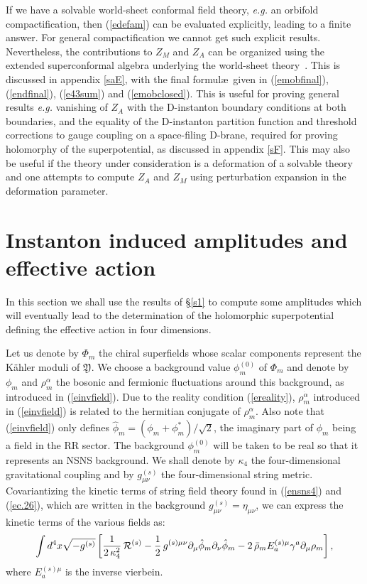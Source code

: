 \documentclass[12pt,a4paper]{article}
\newcommand{\be}{\begin{equation}}
\newcommand{\ee}{\end{equation}}
\newcommand{\refb}[1]{(\ref{#1})}
\newcommand{\p}{\partial}
\def\[{\left[}
\def\]{\right]}
\newcommand{\cR}{\mathcal{R}}
\newcommand{\dalpha}{\beta}
\def\CY{\mathfrak{Y}}
\def\dalpha{{\dot\alpha}}
\def\xxi{\rho}
\begin{document}
If we have a solvable world-sheet conformal field theory, {\it e.g.} an orbifold compactification,
then \refb{edefam} can be evaluated explicitly, leading to a
finite answer. For general compactification we cannot get such explicit results.
Nevertheless, the contributions to $Z_M$ and $Z_A$ can be organized using the
extended superconformal algebra underlying the world-sheet theory~\cite{Eguchi:1988vra,Odake:1988bh,Odake:1989dm,Odake:1989ev}.
This is discussed in appendix \ref{saE}, with the final formul\ae\ given in
\refb{emobfinal}, \refb{endfinal}, \refb{e43sum} and \refb{emobclosed}.
This is useful for proving general results {\it e.g.} vanishing
of $Z_A$ with the D-instanton boundary conditions at both boundaries, and the equality of
the D-instanton partition function and threshold corrections to gauge coupling on a space-filing D-brane, required
for proving holomorphy of the superpotential, as discussed
in appendix \ref{sF}.
This may also be useful if the theory under consideration
is a deformation of a solvable theory and one attempts to compute $Z_A$ and $Z_M$ using
perturbation expansion in the deformation parameter.


\section{Instanton induced amplitudes and effective action} \label{s1a}

In this section we shall use the results of \S\ref{s1}
to compute some amplitudes which will eventually lead to the determination of the holomorphic
superpotential defining the effective action in four dimensions.

Let us denote by $\Phi_m$ the chiral superfields whose scalar components represent the K\"ahler moduli of $\CY$.
We choose a background value $\phi^{(0)}_{m}$ of $\Phi_m$ and denote
by $\phi_m$ and $\xxi_m^\alpha$
the bosonic and fermionic fluctuations around this background, as introduced in \refb{einvfield}.
Due to the reality condition \refb{ereality}, $\xxi_m^\dalpha$ introduced in
\refb{einvfield} is related to the hermitian conjugate of $\xxi_m^\alpha$.
Also note that \refb{einvfield} only defines $\hat\phi_m=(\phi_m+\phi_m^*)/\sqrt 2$,
the imaginary part of $\phi_m$ being a field in the RR sector.
The background $\phi^{(0)}_{m}$ will be taken to be real so that it represents an NSNS background.
We shall denote by $\kappa_4 $ the four-dimensional gravitational coupling and
by $g^{(s)}_{\mu\nu}$ the four-dimensional string metric.
Covariantizing the kinetic terms of string field theory found in
\refb{ensns4} and \refb{ec.26}, which are written in the background
$g^{(s)}_{\mu\nu}=\eta_{\mu\nu}$, we can express the kinetic terms of the various fields as:
\be\label{estringaction}
\int d^4 x \sqrt{-  g^{(s)}} \[ {1\over 2\, \kappa_4 ^2} \,\cR^{(s)}
-{1\over 2}\,g^{(s)\mu\nu} \p_\mu\hat\phi_{m} \p_\nu\hat\phi_m
 - 2\,\bar {\xxi}_m E^{(s)\mu}_a \gamma^a \p_\mu {\xxi}_m\] ,
\ee
where $E^{(s)\mu}_a$ is the inverse vierbein.
\end{document}
